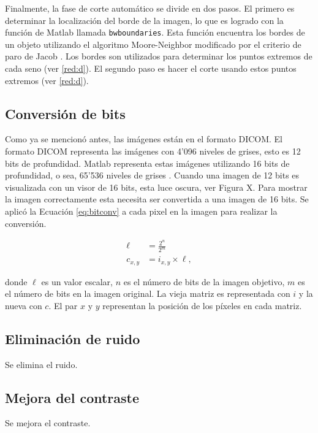 Finalmente, la fase de corte automático se divide en dos pasos. El primero es
determinar la localización del borde de la imagen, lo que es logrado con la
función de Matlab llamada \texttt{bwboundaries}. Esta función encuentra los
bordes de un objeto utilizando el algoritmo Moore-Neighbor modificado por el
criterio de paro de Jacob \cite{gonzalez2009digital}. Los bordes son utilizados
para determinar los puntos extremos de cada seno (ver \ref{red:d}). El segundo
paso es hacer el corte usando estos puntos extremos (ver \ref{red:d}). %

\subsection{Conversión de bits}

Como ya se mencionó antes, las imágenes están en el formato DICOM. El formato
DICOM representa las imágenes con 4'096 niveles de grises, esto es 12 bits de
profundidad. Matlab representa estas imágenes utilizando 16 bits de
profundidad, o sea, 65'536 niveles de grises \cite{mustra2008efficient}. Cuando
una imagen de 12 bits es visualizada con un visor de 16 bits, esta luce oscura,
ver Figura X. Para mostrar la imagen correctamente esta necesita ser convertida
a una imagen de 16 bits. Se aplicó la Ecuación \ref{eq:bitconv} a cada pixel en
la imagen para realizar la conversión.

\begin{equation}
\label{eq:bitconv}
    \begin{split}
            \ell &= \frac{2^{n}}{2^{m}} \\
            c_{x,y} &= i_{x, y} \times \ell,
    \end{split}
\end{equation}

\noindent donde $\ell$ es un valor escalar, $n$ es el número de bits de la imagen
objetivo, $m$ es el número de bits en la imagen original. La vieja matriz es
representada con $i$ y la nueva con $c$. El par $x$ y $y$ representan la
posición de los píxeles en cada matriz.

\subsection{Eliminación de ruido}
Se elimina el ruido.

\subsection{Mejora del contraste}
Se mejora el contraste.

